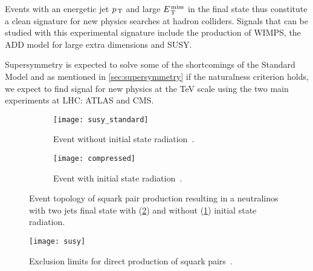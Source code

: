 Events with an energetic jet $p_\mathrm{\, T}$ and large $E_\mathrm{\, T}^\mathrm{\, miss}$ in the final state thus
constitute a clean signature for new physics searches at hadron
colliders. Signals that can be studied with this experimental signature include
the production of WIMPS, the ADD model for large extra dimensions and SUSY\@.

Supersymmetry is expected to solve some of the shortcomings of the Standard
Model and as mentioned in \cref{sec:supersymmetry} if the naturalness
criterion holds, we expect to find signal for new physics at the TeV scale using
the two main experiments at LHC\@: ATLAS and CMS\@.

\begin{figure}[!h]
  \centering
  \begin{subfigure}[t]{.48\linewidth}
    \texttt{[image: susy\_standard]}
    \caption{Event without initial state radiation~\cite{SUSYPub}.}
    \label{fig:susy_standard}
  \end{subfigure} \quad
  \begin{subfigure}[t]{.48\linewidth}
    \texttt{[image: compressed]}
    \caption{Event with initial state radiation~\cite{ExotPub}.}
    \label{fig:susy_compressed}
  \end{subfigure}
  \caption{Event topology of squark pair production resulting in a neutralinos
    with two jets final state with (\cref{fig:susy_compressed}) and without
    (\cref{fig:susy_standard}) initial state radiation.}
  \label{fig:motivation}
\end{figure}

\begin{figure}[!h]
  \centering
  \texttt{[image: susy]}
  \caption{Exclusion limits for direct production of squark
    pairs~\cite{SUSYPub}.}
  \label{fig:susy_exclusion}
\end{figure}
